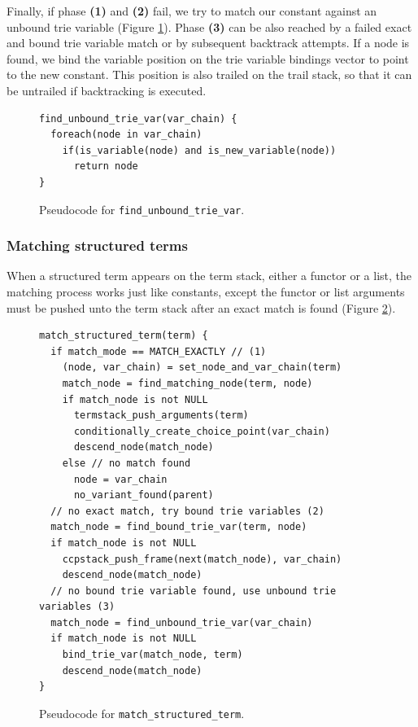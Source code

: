 Finally, if phase \textbf{(1)} and \textbf{(2)} fail, we try to match our constant against an unbound trie variable
(Figure \ref{fig:find_unbound_trie_var}).
Phase \textbf{(3)} can be also reached by a failed exact and bound trie variable match or by subsequent backtrack
attempts. If a node is found, we bind the variable position on the trie variable bindings
vector to point to the new constant. This position is also trailed on the trail stack, so that it can be untrailed
if backtracking is executed.

\begin{figure}[ht]
\begin{Verbatim}[fontsize=\small]
find_unbound_trie_var(var_chain) {
  foreach(node in var_chain)
    if(is_variable(node) and is_new_variable(node))
      return node
}
\end{Verbatim}
\caption{Pseudo\-code for \texttt{find\_unbound\_trie\_var}.}
\label{fig:find_unbound_trie_var}
\end{figure}

\subsubsection{Matching structured terms}

When a structured term appears on the term stack, either a functor or a list, the matching process works
just like constants, except the functor or list arguments must be pushed unto the term stack after an exact
match is found (Figure \ref{fig:match_structured_term}).

\begin{figure}[h]
\begin{Verbatim}[fontsize=\small]
match_structured_term(term) {
  if match_mode == MATCH_EXACTLY // (1)
    (node, var_chain) = set_node_and_var_chain(term)
    match_node = find_matching_node(term, node)
    if match_node is not NULL
      termstack_push_arguments(term)
      conditionally_create_choice_point(var_chain)
      descend_node(match_node)
    else // no match found
      node = var_chain
      no_variant_found(parent)
  // no exact match, try bound trie variables (2)
  match_node = find_bound_trie_var(term, node)
  if match_node is not NULL
    ccpstack_push_frame(next(match_node), var_chain)
    descend_node(match_node)
  // no bound trie variable found, use unbound trie variables (3)
  match_node = find_unbound_trie_var(var_chain)
  if match_node is not NULL
    bind_trie_var(match_node, term)
    descend_node(match_node)
}
\end{Verbatim}
\caption{Pseudo\-code for \texttt{match\_structured\_term}.}
\label{fig:match_structured_term}
\end{figure}

